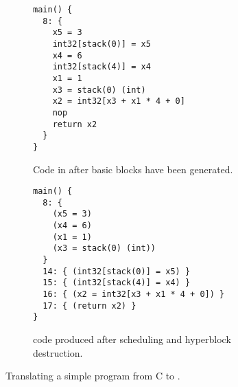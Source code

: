 \begin{figure}
  \centering
    \begin{subfigure}[b]{0.48\linewidth}
\begin{verbatim}
main() {
  8: {
    x5 = 3
    int32[stack(0)] = x5
    x4 = 6
    int32[stack(4)] = x4
    x1 = 1
    x3 = stack(0) (int)
    x2 = int32[x3 + x1 * 4 + 0]
    nop
    return x2
  }
}
\end{verbatim}
      \caption{Code in \rtlblock{} after basic blocks have been generated.}\label{fig:accumulator_seq}
    \end{subfigure}\hfill%
    \begin{subfigure}[b]{0.48\linewidth}
\begin{verbatim}
main() {
  8: {
    (x5 = 3)
    (x4 = 6)
    (x1 = 1)
    (x3 = stack(0) (int))
  }
  14: { (int32[stack(0)] = x5) }
  15: { (int32[stack(4)] = x4) }
  16: { (x2 = int32[x3 + x1 * 4 + 0]) }
  17: { (return x2) }
}
\end{verbatim}
      \caption{\rtlsubpar{} code produced after scheduling and hyperblock destruction.}\label{fig:accumulator_par}
    \end{subfigure}
    \caption{Translating a simple program from C to \rtl{}.}\label{fig:accumulator_gblseqpar}
\end{figure}




